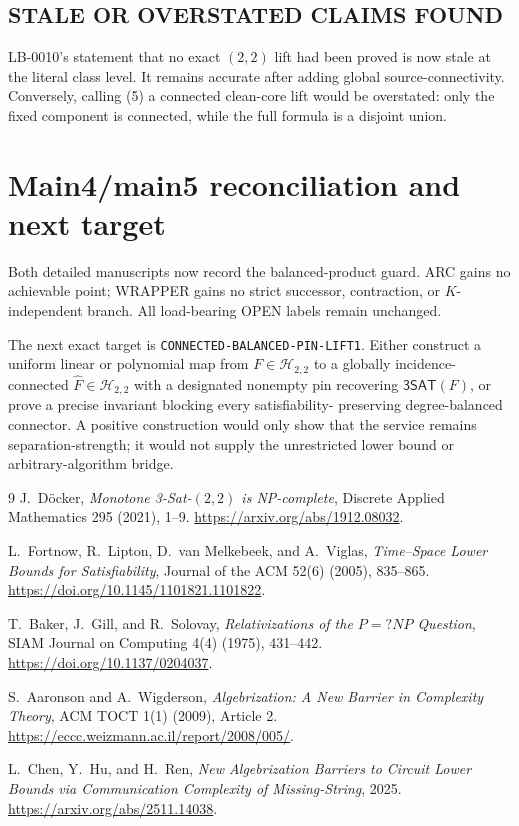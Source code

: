 \documentclass[11pt]{article}
\newcommand{\SAT}{\mathsf{3SAT}}
\begin{document}
\subsection*{STALE OR OVERSTATED CLAIMS FOUND}
LB-0010's statement that no exact $(2,2)$ lift had been proved is now stale
at the literal class level.  It remains accurate after adding global
source-connectivity.  Conversely, calling (5) a connected clean-core lift
would be overstated: only the fixed component is connected, while the full
formula is a disjoint union.

\section{Main4/main5 reconciliation and next target}

Both detailed manuscripts now record the balanced-product guard.  ARC gains
no achievable point; WRAPPER gains no strict successor, contraction, or
$K$-independent branch.  All load-bearing OPEN labels remain unchanged.

The next exact target is \texttt{CONNECTED-BALANCED-PIN-LIFT1}.  Either
construct a uniform linear or polynomial map from
$F\in\mathcal H_{2,2}$ to a globally incidence-connected
$\widehat F\in\mathcal H_{2,2}$ with a designated nonempty pin recovering
$\SAT(F)$, or prove a precise invariant blocking every satisfiability-
preserving degree-balanced connector.  A positive construction would only
show that the service remains separation-strength; it would not supply the
unrestricted lower bound or arbitrary-algorithm bridge.

\begin{thebibliography}{9}
J.~D\"ocker,
\emph{Monotone 3-Sat-$(2,2)$ is NP-complete},
Discrete Applied Mathematics 295 (2021), 1--9.
\url{https://arxiv.org/abs/1912.08032}.

L.~Fortnow, R.~Lipton, D.~van Melkebeek, and A.~Viglas,
\emph{Time--Space Lower Bounds for Satisfiability},
Journal of the ACM 52(6) (2005), 835--865.
\url{https://doi.org/10.1145/1101821.1101822}.

T.~Baker, J.~Gill, and R.~Solovay,
\emph{Relativizations of the $P=?NP$ Question},
SIAM Journal on Computing 4(4) (1975), 431--442.
\url{https://doi.org/10.1137/0204037}.

S.~Aaronson and A.~Wigderson,
\emph{Algebrization: A New Barrier in Complexity Theory},
ACM TOCT 1(1) (2009), Article 2.
\url{https://eccc.weizmann.ac.il/report/2008/005/}.

L.~Chen, Y.~Hu, and H.~Ren,
\emph{New Algebrization Barriers to Circuit Lower Bounds via Communication
Complexity of Missing-String}, 2025.
\url{https://arxiv.org/abs/2511.14038}.
\end{thebibliography}
\end{document}
